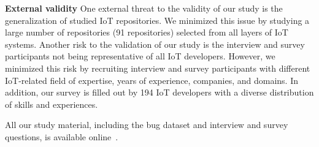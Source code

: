 \textbf{External validity}
One external threat to the validity of our study is the generalization of studied IoT repositories. We minimized this issue by studying a large number of repositories (91 repositories) selected from all layers of IoT systems. Another risk to the validation of our study is the interview and survey participants not being representative of all IoT developers. However, we minimized this risk by recruiting interview and survey participants with different IoT-related field of expertise, years of experience, companies, and domains. In addition, our survey is filled out by 194 IoT developers with a diverse distribution of skills and experiences.

All our study material, including the bug dataset and interview and survey questions, is available online~\cite{repPack}.

\endinput

